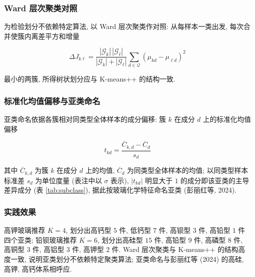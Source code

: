 \documentclass{ctexart}
\begin{document}
\subsubsection{Ward 层次聚类对照}

为检验划分不依赖特定算法, 以 Ward 层次聚类作对照: 从每样本一类出发, 每次合并使簇内离差平方和增量

\begin{equation*}
\Delta{}J_{k\ell}=\frac{\left|\mathcal{G}_k\right|\,\left|\mathcal{G}_\ell\right|}{\left|\mathcal{G}_k\right|+\left|\mathcal{G}_\ell\right|}\sum_{d\in\mathcal{Q}}\left(\mu_{kd}-\mu_{\ell{}d}\right)^{2}
\end{equation*}

最小的两簇, 所得树状划分应与 K-means++ 的结构一致.


\subsubsection{标准化均值偏移与亚类命名}

亚类命名依据各簇相对同类型全体样本的成分偏移: 簇 $k$ 在成分 $d$ 上的标准化均值偏移

\begin{equation*}
t_{kd}=\frac{\overline{C}_{k,d}-\overline{C}_{d}}{s_{d}}
\end{equation*}

其中 $\overline{C}_{k,d}$ 为簇 $k$ 在成分 $d$ 上的均值, $\overline{C}_{d}$ 为同类型全体样本的均值; 以同类型样本标准差 $s_d$ 为单位度量 (表注中以 $\sigma$ 表示), $\left|t_{kd}\right|$ 明显大于 $1$ 的成分即该亚类的主导差异成分 (表 \ref{tab:subclass}), 据此按玻璃化学特征命名亚类 (彭丽红等, 2024).


\subsubsection{实践效果}

高钾玻璃推荐 $K=4$, 划分出高钙型 $5$ 件, 低钙型 $7$ 件, 高钡型 $3$ 件, 高铅型 $1$ 件四个亚类; 铅钡玻璃推荐 $K=6$, 划分出高硅型 $15$ 件, 高铅型 $9$ 件, 高磷型 $8$ 件, 高铜型 $3$ 件, 高铝型 $3$ 件, 高钾型 $2$ 件. Ward 层次聚类与 K-means++ 的结构高度一致, 说明亚类划分不依赖特定聚类算法; 亚类命名与彭丽红等 (2024) 的高硅, 高钾, 高钙体系相呼应.
\end{document}
